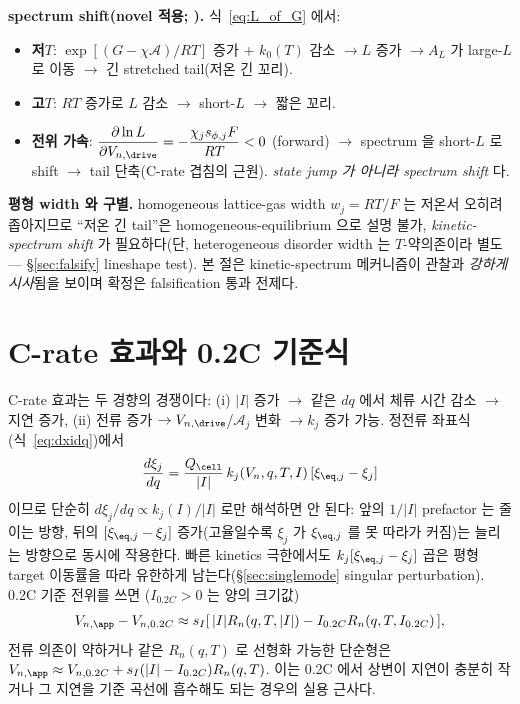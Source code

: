 \textbf{spectrum shift(novel 적용; ).} 식~\eqref{eq:L_of_G} 에서:
\begin{itemize}[leftmargin=1.4em]
\item \textbf{저$T$}: $\exp[(G-\chi\mathcal A)/RT]$ 증가 + $k_0(T)$ 감소 $\to L$ 증가 $\to A_L$ 가 large-$L$
  로 이동 $\to$ 긴 stretched tail(저온 긴 꼬리).
\item \textbf{고$T$}: $RT$ 증가로 $L$ 감소 $\to$ short-$L$ $\to$ 짧은 꼬리.
\item \textbf{전위 가속}: $\dfrac{\partial\ln L}{\partial V_{n,\drive}}=-\dfrac{\chi_j s_{\phi,j}F}{RT}<0$
  (forward) $\to$ spectrum 을 short-$L$ 로 shift $\to$ tail 단축(C-rate 겹침의 근원). \emph{state jump 가
  아니라 spectrum shift} 다.
\end{itemize}
\textbf{평형 width 와 구별.} homogeneous lattice-gas width $w_j=RT/F$ 는 저온서 오히려 좁아지므로 ``저온
긴 tail''은 homogeneous-equilibrium 으로 설명 불가, \emph{kinetic-spectrum shift} 가 필요하다(단,
heterogeneous disorder width 는 $T$-약의존이라 별도 — \S\ref{sec:falsify} lineshape test). 본 절은
kinetic-spectrum 메커니즘이 관찰과 \emph{강하게 시사}됨을 보이며 확정은 falsification 통과 전제다.

\section{C-rate 효과와 0.2C 기준식}\label{sec:crate}
C-rate 효과는 두 경향의 경쟁이다: (i) $|I|$ 증가 $\to$ 같은 $dq$ 에서 체류 시간 감소 $\to$ 지연 증가,
(ii) 전류 증가 $\to V_{n,\drive}$/$\mathcal A_j$ 변화 $\to k_j$ 증가 가능. 정전류 좌표식
(식~\eqref{eq:dxidq})에서
\begin{equation}
\frac{d\xi_j}{dq}=\frac{Q_\cell}{|I|}\,k_j(V_n,q,T,I)\,[\xi_{\eq,j}-\xi_j]
\label{eq:crate}
\end{equation}
이므로 단순히 $d\xi_j/dq\propto k_j(I)/|I|$ 로만 해석하면 안 된다: 앞의 $1/|I|$ prefactor 는 줄이는
방향, 뒤의 $[\xi_{\eq,j}-\xi_j]$ 증가(고율일수록 $\xi_j$ 가 $\xi_{\eq,j}$ 를 못 따라가 커짐)는 늘리는
방향으로 동시에 작용한다. 빠른 kinetics 극한에서도 $k_j[\xi_{\eq,j}-\xi_j]$ 곱은 평형 target 이동률을
따라 유한하게 남는다(\S\ref{sec:singlemode} singular perturbation). 0.2C 기준 전위를 쓰면
($I_{0.2C}>0$ 는 양의 크기값)
\begin{equation}
V_{n,\app}-V_{n,0.2C}\approx s_I[\,|I|R_n(q,T,|I|)-I_{0.2C}R_n(q,T,I_{0.2C})\,],
\label{eq:02c_gen}
\end{equation}
전류 의존이 약하거나 같은 $R_n(q,T)$ 로 선형화 가능한 단순형은
$V_{n,\app}\approx V_{n,0.2C}+s_I(|I|-I_{0.2C})R_n(q,T)$. 이는 0.2C 에서 상변이 지연이 충분히 작거나 그
지연을 기준 곡선에 흡수해도 되는 경우의 실용 근사다.

